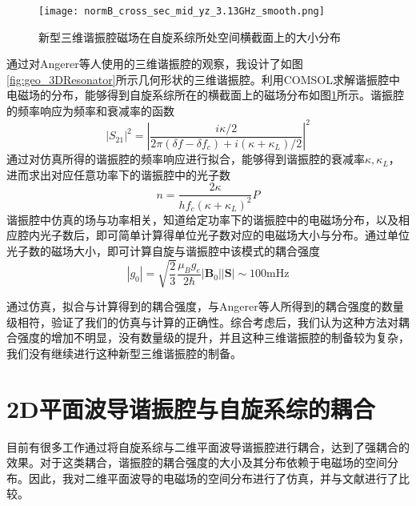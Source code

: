         \begin{figure}[h]
                \centering
            \texttt{[image: normB\_cross\_sec\_mid\_yz\_3.13GHz\_smooth.png]}
            \caption{新型三维谐振腔磁场在自旋系综所处空间横截面上的大小分布}
            \label{fig:sim_result_BField_crossSection}
        \end{figure}

        通过对Angerer等人使用的三维谐振腔的观察，我设计了如图\ref{fig:geo_3DResonator}所示几何形状的三维谐振腔。利用COMSOL求解谐振腔中电磁场的分布，能够得到自旋系综所在的横截面上的磁场分布如图\ref{fig:sim_result_BField_crossSection}所示。谐振腔的频率响应为频率和衰减率的函数\cite{grezes2016towards}
        \begin{equation}
            |S_{21}|^2 = \left | \frac{i \kappa/2}{2 \pi (\delta f - \delta f_c)+i (\kappa + \kappa_L)/2 } \right|^2
        \end{equation}
        通过对仿真所得的谐振腔的频率响应进行拟合，能够得到谐振腔的衰减率$ \kappa, \kappa_L $，进而求出对应任意功率下的谐振腔中的光子数\cite{grezes2016towards}
        \begin{equation}
            n = \frac{2 \kappa}{h f_c (\kappa+ \kappa_L)^2} P
        \end{equation}
        谐振腔中仿真的场与功率相关，知道给定功率下的谐振腔中的电磁场分布，以及相应腔内光子数后，即可简单计算得单位光子数对应的电磁场大小与分布。通过单位光子数的磁场大小，即可计算自旋与谐振腔中该模式的耦合强度\cite{Angerer2016}
        \begin{equation}
            |g_0| = \sqrt{\frac{2}{3}} \frac{\mu_B g_e}{2\hbar} |\bm B_0||\bm S| \sim 100 \mathrm{mHz}
        \end{equation}

        通过仿真，拟合与计算得到的耦合强度，与Angerer等人所得到的耦合强度的数量级相符，验证了我们的仿真与计算的正确性。综合考虑后，我们认为这种方法对耦合强度的增加不明显，没有数量级的提升，并且这种三维谐振腔的制备较为复杂，我们没有继续进行这种新型三维谐振腔的制备。
        
        
        





        \section{2D平面波导谐振腔与自旋系综的耦合} %
        \label{sec:2d平面波导谐振腔与自旋系综的耦合}

        目前有很多工作通过将自旋系综与二维平面波导谐振腔进行耦合，达到了强耦合的效果\cite{kubo2010,Schuster2010}。对于这类耦合，谐振腔的耦合强度的大小及其分布依赖于电磁场的空间分布。因此，我对二维平面波导的电磁场的空间分布进行了仿真，并与文献进行了比较。

